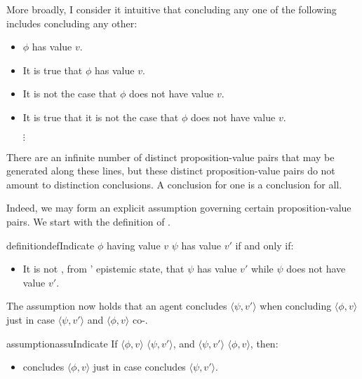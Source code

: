 \begin{note}
  More broadly, I consider it intuitive that concluding any one of the following includes concluding any other:
  \begin{itemize}
  \item \(\phi\) has value \(v\).
  \item It is true that \(\phi\) has value \(v\).
  \item It is not the case that \(\phi\) does not have value \(v\).
  \item It is true that it is not the case that \(\phi\) does not have value \(v\).
    \begin{center}
      \(\vdots\)
    \end{center}
  \end{itemize}

  There are an infinite number of distinct proposition-value pairs that may be generated along these lines, but these distinct proposition-value pairs do not amount to distinction conclusions.
  A conclusion for one is a conclusion for all.
\end{note}

\begin{note}
  Indeed, we may form an explicit assumption governing certain proposition-value pairs.
  We start with the definition of \indicateN{}.
\end{note}

\begin{note}
  \begin{restatable}[\indicateN{2}]{definition}{defIndicate}
    \label{def:indication}
    \(\phi\) having value \(v\) \emph{} \(\psi\) has value \(v'\) if and only if:
    \begin{itemize}
    \item
      It is not \epPAd{}, from \vAgent{}' epistemic state, that \(\psi\) has value \(v'\) while \(\psi\) does not have value \(v'\).
    \end{itemize}
    \vspace{-\baselineskip}
  \end{restatable}
\end{note}

\begin{note}
  The assumption now holds that an agent concludes \(\langle \psi,v' \rangle\) when concluding \(\langle \phi,v \rangle\) just in case \(\langle \psi,v' \rangle\) and \(\langle \phi,v \rangle\) co-\indicateV{}.

  \begin{restatable}[\indicateN{2}]{assumption}{assuIndicate}
    \label{assu:indication}
    If \(\langle \phi,v \rangle\)  \(\langle \psi,v' \rangle\), and \(\langle \psi,v' \rangle\)  \(\langle \phi,v \rangle\), then:

    \begin{itemize}
    \item
      \vAgent{} concludes \(\langle \phi,v \rangle\) just in case \vAgent{} concludes \(\langle \psi,v' \rangle\).
    \end{itemize}
    \vspace{-\baselineskip}
  \end{restatable}
\end{note}

